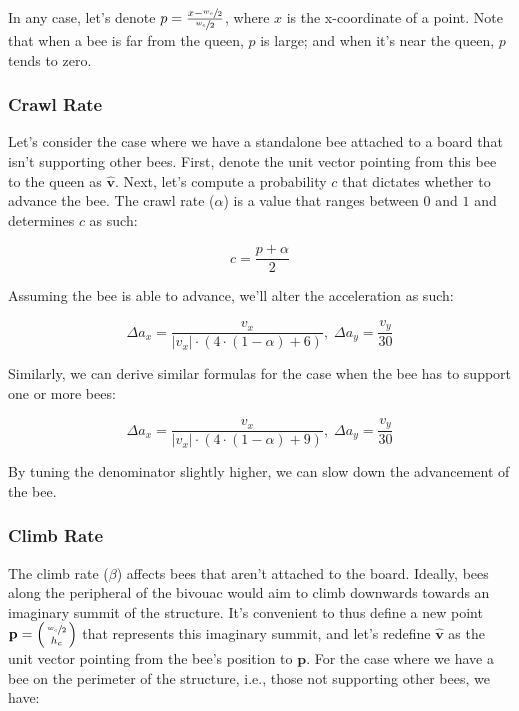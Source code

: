 \documentclass[a4paper,10pt]{article}
\begin{document}
\begin{multicols}{2}
    In any case, let's denote $p = \frac{x - \sfrac{w_{c}}{2}}{\sfrac{w_{c}}{2}}$, where
    $x$ is the x-coordinate of a point. Note that when a bee is far from the queen, $p$ is
    large; and when it's near the queen, $p$ tends to zero.

    \subsubsection{Crawl Rate}

    Let's consider the case where we have a standalone bee attached to a board that isn't
    supporting other bees. First, denote the unit vector pointing from this bee to the queen
    as $\hat{\mathbf{v}}$. Next, let's compute a probability $c$ that dictates whether to advance the bee.
    The crawl rate ($\alpha$) is a value that ranges between $0$ and $1$ and determines $c$
    as such:

    \begin{equation}
        c = \frac{p + \alpha}{2}
    \end{equation}

    Assuming the bee is able to advance, we'll alter the acceleration as such:

    \begin{equation}
        \Delta a_{x} = \frac{v_{x}}{|v_{x}| \cdot (4 \cdot  (1-\alpha) + 6)}, \;
        \Delta a_{y} = \frac{v_{y}}{30}
    \end{equation}

    Similarly, we can derive similar formulas for the case when the bee has to support one or
    more bees:

    \begin{equation}
        \Delta a_{x} = \frac{v_{x}}{|v_{x}| \cdot (4 \cdot  (1-\alpha) + 9)}, \;
        \Delta a_{y} = \frac{v_{y}}{30}
    \end{equation}

    By tuning the denominator slightly higher, we can slow down the advancement of the bee.

    \subsubsection{Climb Rate}

    The climb rate ($\beta$) affects bees that aren't attached to the board. Ideally, bees along the
    peripheral of the bivouac would aim to climb downwards towards an imaginary summit of the
    structure. It's convenient to thus define a new point
    $\mathbf{p} = \begin{psmallmatrix} \sfrac{w_{c}}{2} \\ h_{c} \end{psmallmatrix}$ that
    represents this imaginary summit, and let's redefine $\hat{\mathbf{v}}$ as the unit vector pointing from the
    bee's position to $\mathbf{p}$. For the case where we have a bee on the perimeter of the structure,
    i.e., those not supporting other bees, we have:


\end{multicols}
\end{document}
